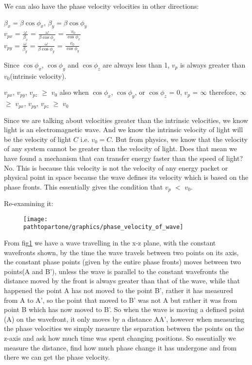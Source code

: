 We can also have the phase velocity velocities in other directions:
\begin{center}
$\beta_x = \beta\cos\phi_{x}$, $\beta_y = \beta\cos\phi_{y}$\\
$v_{px}$ = $\frac{\omega}{\beta_x}$ = $\frac{\omega}{\beta\cos\phi_{x}}$ = $\frac{v_0}{\cos\phi_{x}}$\\
$v_{py}$ = $\frac{\omega}{\beta_y}$ = $\frac{\omega}{\beta\cos\phi_{y}}$ = $\frac{v_0}{\cos\phi_{y}}$
\end{center}
Since $\cos\phi_{x}$, $\cos\phi_{y}$ and $\cos\phi_{z}$ are always less than 1, $v_p$ is always greater than $v_0$(intrinsic velocity).
\begin{center}
$v_{px}$, $v_{py}$, $v_{pz}$ $\geq$ $v_0$
also when $\cos\phi_{x}$, $\cos\phi_{y}$, or $\cos\phi_{z}$ = 0, $v_p$ = $\infty$
therefore, $\infty$ $\geq$ $v_{px}$, $v_{py}$, $v_{pz}$ $\geq$ $v_0$
\end{center}
Since we are talking about velocities greater than the intrinsic velocities, we know light is an electromagnetic wave. And we know the intrinsic velocity of light will be the velocity of light $C$ i.e. $v_0 = C$.
But from physics, we know that the velocity of any system cannot be greater than the velocity of light.
Does that mean we have found a mechanism that can transfer energy faster than the speed of light?
No. This is because this velocity is not the velocity of any energy packet or physical point in space because the wave defines its velocity which is based on the phase fronts. This essentially gives the condition that $v_p$ $<$ $v_0$.

Re-examining it:
\begin{figure}[h]
\centering
\texttt{[image: \\pathtopartone/graphics/phase\_velocity\_of\_wave]}
\caption{}
\label{fig:wave_with_constant_wave_fonts_in_xy_plane}
\end{figure}

From fig\ref{fig:wave_with_constant_wave_fonts_in_xy_plane} we have a wave travelling in the x-z plane, with the constant wavefronts shown, by the time the wave travels between two points on its axis, the constant phase points (given by the entire phase fronts) moves between two points(A and B'), unless the wave is parallel to the constant wavefronts the distance moved by the front is always greater than that of the wave, while that happened the point A has not moved to the point B', rather it has measured from A to A', so the point that moved to B' was not A but rather it was from point B which has now moved to B'. So when the wave is moving a defined point (A) on the wavefront, it only moves by a distance AA', however when measuring the phase velocities we simply measure the separation between the points on the z-axis and ask how much time was spent changing positions. So essentially we measure the distance, find how much phase change it has undergone and from there we can get the phase velocity.

